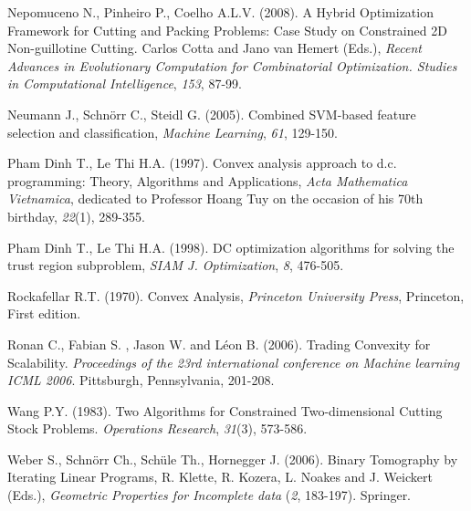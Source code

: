\documentclass{iesmart}
\begin{document}
\begin{thebibliography}{99}
Nepomuceno N., Pinheiro P., Coelho A.L.V. (2008). A Hybrid
Optimization Framework for Cutting and Packing Problems: Case
Study on Constrained 2D Non-guillotine Cutting. Carlos Cotta and
Jano van Hemert (Eds.), \emph{Recent Advances in Evolutionary
Computation for Combinatorial Optimization. Studies in
Computational Intelligence}, \emph{153}, 87-99.


Neumann J., Schn\"{o}rr C., Steidl G. (2005). Combined SVM-based
feature selection and classification, \emph{Machine Learning},
\emph{61}, 129-150.


Pham Dinh T., Le Thi H.A. (1997). Convex analysis approach to d.c.
programming: Theory, Algorithms and Applications, \emph{Acta
Mathematica Vietnamica}, dedicated to Professor Hoang Tuy on the
occasion of his 70th birthday, \emph{22}(1), 289-355.


Pham Dinh T., Le Thi H.A. (1998). DC optimization algorithms for
solving the trust region subproblem, \emph{SIAM J. Optimization},
\emph{8}, 476-505.


Rockafellar R.T. (1970). Convex Analysis, \emph{Princeton
University Press}, Princeton, First edition.


Ronan C., Fabian S. , Jason W. and L\'{e}on B. (2006). Trading
Convexity for Scalability. \emph{Proceedings of the 23rd
international conference on Machine learning ICML 2006}.
Pittsburgh, Pennsylvania, 201-208.


Wang P.Y. (1983). Two Algorithms for Constrained Two-dimensional
Cutting Stock Problems. \emph{Operations Research}, \emph{31}(3),
573-586.


Weber S., Schn\"{o}rr Ch., Sch\"{u}le Th., Hornegger J. (2006).
Binary Tomography by Iterating Linear Programs, R. Klette, R.
Kozera, L. Noakes and J. Weickert (Eds.), \emph{Geometric
Properties for Incomplete data} (\emph{2}, 183-197). Springer.




\end{thebibliography}
\end{document}
